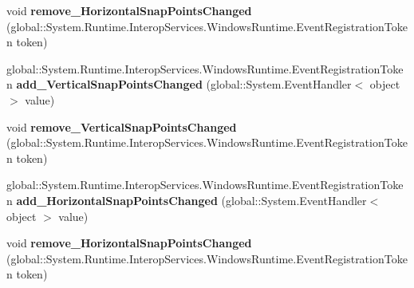 \begin{DoxyCompactItemize}
\item 
\mbox{\label{interface_windows_1_1_u_i_1_1_xaml_1_1_controls_1_1_primitives_1_1_i_scroll_snap_points_info_aa3fb03dbd56b4a79ce2cb3184e76cd1a}} 
void {\bfseries remove\+\_\+\+Horizontal\+Snap\+Points\+Changed} (global\+::\+System.\+Runtime.\+Interop\+Services.\+Windows\+Runtime.\+Event\+Registration\+Token token)
\item 
\mbox{\label{interface_windows_1_1_u_i_1_1_xaml_1_1_controls_1_1_primitives_1_1_i_scroll_snap_points_info_a571d9a77feb356614085f5bd5c61164d}} 
global\+::\+System.\+Runtime.\+Interop\+Services.\+Windows\+Runtime.\+Event\+Registration\+Token {\bfseries add\+\_\+\+Vertical\+Snap\+Points\+Changed} (global\+::\+System.\+Event\+Handler$<$ object $>$ value)
\item 
\mbox{\label{interface_windows_1_1_u_i_1_1_xaml_1_1_controls_1_1_primitives_1_1_i_scroll_snap_points_info_aa8b329ace55d867384797aed3c99571d}} 
void {\bfseries remove\+\_\+\+Vertical\+Snap\+Points\+Changed} (global\+::\+System.\+Runtime.\+Interop\+Services.\+Windows\+Runtime.\+Event\+Registration\+Token token)
\item 
\mbox{\label{interface_windows_1_1_u_i_1_1_xaml_1_1_controls_1_1_primitives_1_1_i_scroll_snap_points_info_a821f2a593f07df670bedc1aa736522df}} 
global\+::\+System.\+Runtime.\+Interop\+Services.\+Windows\+Runtime.\+Event\+Registration\+Token {\bfseries add\+\_\+\+Horizontal\+Snap\+Points\+Changed} (global\+::\+System.\+Event\+Handler$<$ object $>$ value)
\item 
\mbox{\label{interface_windows_1_1_u_i_1_1_xaml_1_1_controls_1_1_primitives_1_1_i_scroll_snap_points_info_aa3fb03dbd56b4a79ce2cb3184e76cd1a}} 
void {\bfseries remove\+\_\+\+Horizontal\+Snap\+Points\+Changed} (global\+::\+System.\+Runtime.\+Interop\+Services.\+Windows\+Runtime.\+Event\+Registration\+Token token)
\item 

\end{DoxyCompactItemize}
